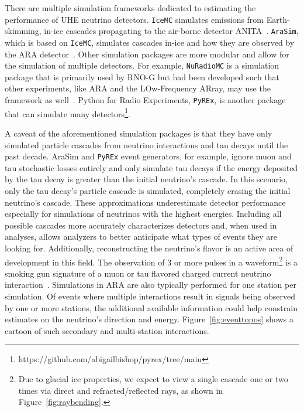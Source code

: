   There are multiple simulation frameworks dedicated to estimating the performance of UHE neutrino detectors.
  \texttt{IceMC} simulates emissions from Earth-skimming, in-ice cascades propagating to the air-borne detector ANITA~\citep{icemc}. 
  \texttt{AraSim}, which is based on \texttt{IceMC}, simulates cascades in-ice and how they are observed by the ARA detector~\citep{ara_veff}. %
  Other simulation packages are more modular and allow for the simulation of multiple detectors.
  For example, \texttt{NuRadioMC} is a simulation package that is primarily used by \mbox{RNO-G} but had been developed such that other experiments, like ARA and the LOw-Frequency ARray, may use the framework as well~\citep{nuradiomc1, nuradiomc2}. 
  Python for Radio Experiments, \texttt{PyREx}, is another package that can simulate many detectors\footnote{https://github.com/abigailbishop/pyrex/tree/main}. 

  A caveat of the aforementioned simulation packages is that they have only simulated particle cascades from neutrino interactions and tau decays until the past decade.
  AraSim and \texttt{PyREx} event generators, for example, ignore muon and tau stochastic losses entirely and only simulate tau decays if the energy deposited by the tau decay is greater than the initial neutrino's cascade. 
  In this scenario, only the tau decay's particle cascade is simulated, completely erasing the initial neutrino's cascade.
  These approximations underestimate detector performance especially for simulations of neutrinos with the highest energies. 
  Including all possible cascades more accurately characterizes detectors and, when used in analyses, allows analyzers to better anticipate what types of events they are looking for.
  Additionally, reconstructing the neutrino's flavor is an active area of development in this field. 
  The observation of 3 or more pulses in a waveform\footnote{Due to glacial ice properties, we expect to view a single cascade one or two times via direct and refracted/reflected rays, as shown in Figure~\ref{fig:raybending}.} is a smoking gun signature of a muon or tau flavored charged current neutrino interaction~\citep{flavor_reco}. 
  Simulations in ARA are also typically performed for one station per simulation. 
  Of events where multiple interactions result in signals being observed by one or more stations, the additional available information could help constrain estimates on the neutrino's direction and energy. 
  Figure~\ref{fig:eventtopos} shows a cartoon of such secondary and multi-station interactions. 

